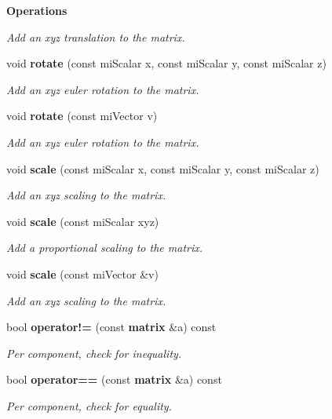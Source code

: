 \begin{Indent}{\bf Operations}
\begin{CompactItemize}
\begin{CompactList}\small\item\em Add an xyz translation to the matrix. \item\end{CompactList}\item 
void {\bf rotate} (const mi\-Scalar x, const mi\-Scalar y, const mi\-Scalar z)
\begin{CompactList}\small\item\em Add an xyz euler rotation to the matrix. \item\end{CompactList}\item 
void {\bf rotate} (const mi\-Vector v)
\begin{CompactList}\small\item\em Add an xyz euler rotation to the matrix. \item\end{CompactList}\item 
void {\bf scale} (const mi\-Scalar x, const mi\-Scalar y, const mi\-Scalar z)
\begin{CompactList}\small\item\em Add an xyz scaling to the matrix. \item\end{CompactList}\item 
void {\bf scale} (const mi\-Scalar xyz)
\begin{CompactList}\small\item\em Add a proportional scaling to the matrix. \item\end{CompactList}\item 
void {\bf scale} (const mi\-Vector \&v)
\begin{CompactList}\small\item\em Add an xyz scaling to the matrix. \item\end{CompactList}\item 
bool {\bf operator!=} (const {\bf matrix} \&a) const 
\begin{CompactList}\small\item\em Per component, check for inequality. \item\end{CompactList}\item 
bool {\bf operator==} (const {\bf matrix} \&a) const 
\begin{CompactList}\small\item\em Per component, check for equality. \item\end{CompactList}\item 

\end{CompactItemize}
\end{Indent}
